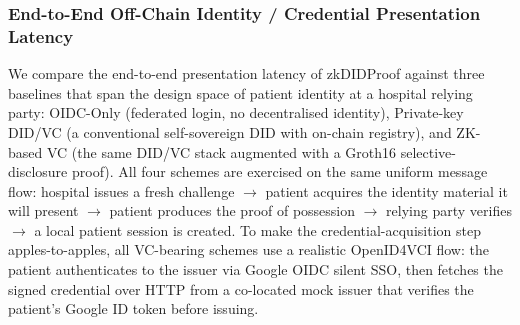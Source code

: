 %
%
%

\subsubsection{End-to-End Off-Chain Identity / Credential Presentation Latency}
\label{ssub:presentation-latency}

We compare the end-to-end presentation latency of \textsf{zkDIDProof} against
three baselines that span the design space of patient identity at a hospital
relying party: \textsf{OIDC-Only} (federated login, no decentralised identity),
\textsf{Private-key DID/VC} (a conventional self-sovereign DID with on-chain
registry), and \textsf{ZK-based VC} (the same DID/VC stack augmented with a
Groth16 selective-disclosure proof). All four schemes are exercised on the
same uniform message flow: hospital issues a fresh challenge $\to$ patient
acquires the identity material it will present $\to$ patient produces the
proof of possession $\to$ relying party verifies $\to$ a local patient
session is created. To make the credential-acquisition step
apples-to-apples, all VC-bearing schemes use a realistic OpenID4VCI flow:
the patient authenticates to the issuer via Google OIDC silent SSO, then
fetches the signed credential over HTTP from a co-located mock issuer that
verifies the patient's Google ID token before issuing.

